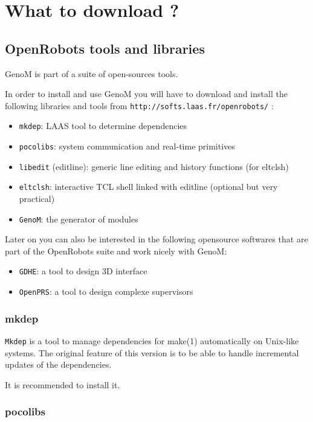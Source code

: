 \section{What to download ?}
\label{sec|configuration|download}

\subsection{OpenRobots tools and libraries}

GenoM is part of a suite of open-sources tools. 

In order to install and use GenoM you will have to download and install
the following libraries and tools from  
\texttt{http://softs.laas.fr/openrobots/} :

\begin{itemize}
\item \texttt{mkdep}: LAAS tool to determine dependencies
\item \texttt{pocolibs}: system communication and real-time primitives
\item \texttt{libedit} (editline): generic line editing and history
functions (for eltclsh)
\item \texttt{eltclsh}: interactive TCL shell linked with editline (optional but very practical)
\item \texttt{GenoM}: the generator of modules
\end{itemize}

Later on you can also be interested in the following opensource softwares
that are part of the OpenRobots suite and work nicely with GenoM:

\begin{itemize}
\item \texttt{GDHE}: a tool to design 3D interface
\item \texttt{OpenPRS}: a tool to design complexe supervisors
\end{itemize}

\subsubsection{mkdep}

\texttt{Mkdep} is a tool to manage dependencies for make(1) automatically on
Unix-like systems.  The original feature of this version is to be able to
handle incremental updates of the dependencies.

It is recommended to install it.

\subsubsection{pocolibs}

